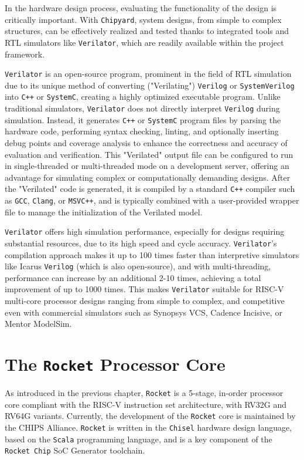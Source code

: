 In the hardware design process, evaluating the functionality of the design is critically important. With \texttt{Chipyard}, system designs, from simple to complex structures, can be effectively realized and tested thanks to integrated tools and RTL simulators like \texttt{Verilator}, which are readily available within the project framework.

\texttt{Verilator} is an open-source program, prominent in the field of RTL simulation due to its unique method of converting ("Verilating") \texttt{Verilog} or \texttt{SystemVerilog} into \texttt{C++} or \texttt{SystemC}, creating a highly optimized executable program. Unlike traditional simulators, \texttt{Verilator} does not directly interpret \texttt{Verilog} during simulation. Instead, it generates \texttt{C++} or \texttt{SystemC} program files by parsing the hardware code, performing syntax checking, linting, and optionally inserting debug points and coverage analysis to enhance the correctness and accuracy of evaluation and verification. This "Verilated" output file can be configured to run in single-threaded or multi-threaded mode on a development server, offering an advantage for simulating complex or computationally demanding designs. After the "Verilated" code is generated, it is compiled by a standard \texttt{C++} compiler such as \texttt{GCC}, \texttt{Clang}, or \texttt{MSVC++}, and is typically combined with a user-provided wrapper file to manage the initialization of the Verilated model.

\texttt{Verilator} offers high simulation performance, especially for designs requiring substantial resources, due to its high speed and cycle accuracy. \texttt{Verilator}'s compilation approach makes it up to 100 times faster than interpretive simulators like Icarus \texttt{Verilog} (which is also open-source), and with multi-threading, performance can increase by an additional 2-10 times, achieving a total improvement of up to 1000 times. This makes \texttt{Verilator} suitable for RISC-V multi-core processor designs ranging from simple to complex, and competitive even with commercial simulators such as Synopsys VCS, Cadence Incisive, or Mentor ModelSim.

\section{The \texttt{Rocket} Processor Core}
\label{sec:rocket_core}

As introduced in the previous chapter, \texttt{Rocket} is a 5-stage, in-order processor core compliant with the RISC-V instruction set architecture, with RV32G and RV64G variants. Currently, the development of the \texttt{Rocket} core is maintained by the CHIPS Alliance. \texttt{Rocket} is written in the \texttt{Chisel} hardware design language, based on the \texttt{Scala} programming language, and is a key component of the \texttt{Rocket Chip} SoC Generator toolchain.

